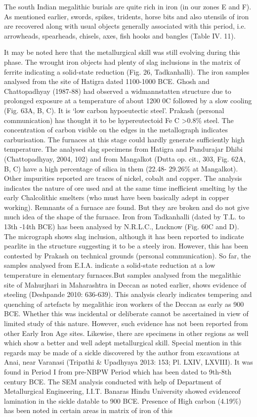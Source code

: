 The south Indian megalithic burials are quite rich in iron (in our zones E and F). As mentioned earlier, swords, spikes, tridents, horse bits and also utensils of iron are recovered along with usual objects generally associated with this period, i.e. arrowheads, spearheads, chisels, axes, fish hooks and bangles (Table IV. 11).

It may be noted here that the metallurgical skill was still evolving during this phase. The wrought iron objects had plenty of slag inclusions in the matrix of ferrite indicating a solid-state reduction (Fig. 26, Tadkanhalli). The iron samples analysed from the site of Hatigra dated 1100-1000 BCE. Ghosh and Chattopadhyay (1987-88) had observed a widmannstatten structure due to prolonged exposure at a temperature of about 1200 0C followed by a slow cooling (Fig. 63A, B, C). It is ‘low carbon hypoeutectic steel’. Prakash (personal communication) has thought it to be hypereutectoid Fe C \textgreater  0.8\% steel. The concentration of carbon visible on the edges in the metallograph indicates carburisation. The furnaces at this stage could hardly generate sufficiently high temperature. The analysed slag specimens from Hatigra and Pandurajar Dhibi (Chattopadhyay, 2004, 102) and from Mangalkot (Dutta op. cit., 303, Fig. 62A, B, C) have a high percentage of silica in them (22.48- 29.26\% at Mangalkot). Other impurities reported are traces of nickel, cobalt and copper. The analysis indicates the nature of ore used and at the same time inefficient smelting by the early Chalcolithic smelters (who must have been basically adept in copper working). Remnants of a furnace are found. But they are broken and do not give much idea of the shape of the furnace. Iron from Tadkanhalli (dated by T.L. to 13th -14th BCE) has been analysed by N.R.L.C., Lucknow (Fig. 60C and D). The micrograph shows slag inclusion, although it has been reported to indicate pearlite in the structure suggesting it to be a steely iron. However, this has been contested by Prakash on technical grounds (personal communication). So far, the samples analysed from E.I.A. indicate a solid-state reduction at a low temperature in elementary furnaces.But samples analysed from the megalithic site of Mahurjhari in Maharashtra in Deccan as noted earlier, shows evidence of steeling (Deshpande 2010: 636-639). This analysis clearly indicates tempering and quenching of artefacts by megalithic iron workers of the Deccan as early as 900 BCE. Whether this was incidental or deliberate cannot be ascertained in view of limited study of this nature. However, such evidence has not been reported from other Early Iron Age sites. Likewise, there are specimens in other regions as well which show a better and well adept metallurgical skill. Special mention in this regards may be made of a sickle discovered by the author from excavations at Anai, near Varanasi (Tripathi \& Upadhyaya 2013: 153; Pl. LXIV, LXVIII). It was found in Period I from pre-NBPW Period which has been dated to 9th-8th century BCE. The SEM analysis conducted with help of Department of Metallurgical Engineering, I.I.T. Banaras Hindu University showed evidenceof lamination in the sickle datable to 900 BCE. Presence of High carbon (4.19\%) has been noted in certain areas in matrix of iron of this 